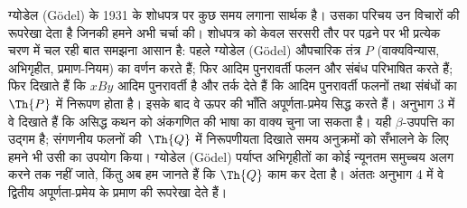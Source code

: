 \documentclass[../../../include/open-logic-section]{subfiles}
\begin{document}


ग्योडेल (G\"odel) के 1931 के शोधपत्र पर कुछ समय लगाना सार्थक है। उसका
परिचय उन विचारों की रूपरेखा देता है जिनकी हमने अभी चर्चा की। शोधपत्र को
केवल सरसरी तौर पर पढ़ने पर भी प्रत्येक चरण में चल रही बात समझना आसान है:
पहले ग्योडेल (G\"odel) औपचारिक तंत्र $P$ (वाक्यविन्यास, अभिगृहीत, प्रमाण-नियम) का
वर्णन करते हैं; फिर आदिम पुनरावर्ती फलन और संबंध परिभाषित करते हैं; फिर
दिखाते हैं कि $x B y$ आदिम पुनरावर्ती है और तर्क देते हैं कि आदिम
पुनरावर्ती फलनों तथा संबंधों का $\Th{P}$ में निरूपण होता है। इसके बाद वे
ऊपर की भाँति अपूर्णता-प्रमेय सिद्ध करते हैं। अनुभाग 3 में वे दिखाते हैं कि
असिद्ध कथन को अंकगणित की भाषा का वाक्य चुना जा सकता है। यही $\beta$-उपपत्ति
का उद्गम है; संगणनीय फलनों की~$\Th{Q}$ में निरूपणीयता दिखाते समय अनुक्रमों
को सँभालने के लिए हमने भी उसी का उपयोग किया। ग्योडेल (G\"odel) पर्याप्त अभिगृहीतों
का कोई न्यूनतम समुच्चय अलग करने तक नहीं जाते, किंतु अब हम जानते हैं कि
$\Th{Q}$ काम कर देता है। अंततः अनुभाग 4 में वे द्वितीय अपूर्णता-प्रमेय के
प्रमाण की रूपरेखा देते हैं।
\end{document}
